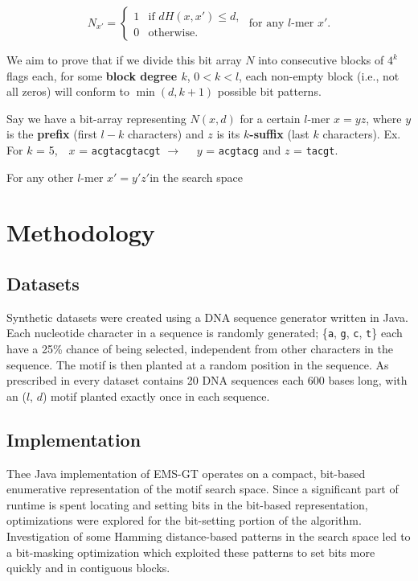 \documentclass[oneside,12pt]{DISCSthesis}
\begin{document}
		\begin{equation*}
			N_{x'} = \left\{
			\begin{array}{rl}
				1 & \text{if } dH(x,x') \leq d,\\
				0 & \text{otherwise.}%
			\end{array} \right.
			\text{ for any $l$-mer }x'.
			\end{equation*}\newline

		We aim to prove that if we divide this bit array $N$ into consecutive blocks of $4^{k}$ flags each, for some {\bf\boldmath block degree $k$}, $0 < k < l$, each non-empty block (i.e., not all zeros) will conform to $\min(d,k+1)$ possible bit patterns.

		Say we have a bit-array representing $N(x,d)$ for a certain $l$-mer $x = yz$, where $y$ is the {\bf prefix} (first $l-k$ characters) and $z$ is its {\boldmath\bf $k$-suffix} (last $k$ characters).\newline
			{\small\hspace*{40pt}Ex. For $k$ = 5,\ \ $x$ = \texttt{acgtacgtacgt} $\rightarrow$ \ \  $y$ = \texttt{acgtacg} and $z$ = \texttt{tacgt}.}

		For any other $l$-mer $x'=y'z'$in the search space 


	

\chapter{Methodology}

	\section{Datasets}
		Synthetic datasets were created using a DNA sequence generator written in Java. Each nucleotide character in a sequence is randomly generated; \{\texttt{a}, \texttt{g}, \texttt{c}, \texttt{t}\} each have a 25\% chance of being selected, independent from other characters in the sequence. The motif is then planted at a random position in the sequence. As prescribed in \cite{pevzner2000combinatorial} every dataset contains 20 DNA sequences each 600 bases long, with an ($l$, $d$) motif planted exactly once in each sequence.

	\section{Implementation}
		Thee Java implementation of EMS-GT operates on a compact, bit-based enumerative representation of the motif search space. Since a significant part of runtime is spent locating and setting bits in the bit-based representation, optimizations were explored for the bit-setting portion of the algorithm. Investigation of some Hamming distance-based patterns in the search space led to a bit-masking optimization which exploited these patterns to set bits more quickly and in contiguous blocks.
\end{document}
